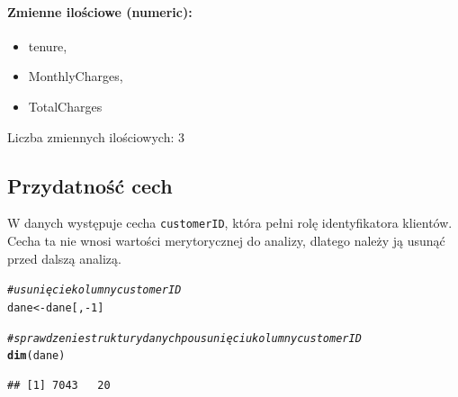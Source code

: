 \documentclass[12pt, a4paper]{article}\usepackage[]{graphicx}\usepackage[]{xcolor}
\makeatletter
\newcommand{\hlnum}[1]{\textcolor[rgb]{0.686,0.059,0.569}{#1}}%
\newcommand{\hlcom}[1]{\textcolor[rgb]{0.678,0.584,0.686}{\textit{#1}}}%
\newcommand{\hlopt}[1]{\textcolor[rgb]{0,0,0}{#1}}%
\newcommand{\hlstd}[1]{\textcolor[rgb]{0.345,0.345,0.345}{#1}}%
\newcommand{\hlkwb}[1]{\textcolor[rgb]{0.69,0.353,0.396}{#1}}%
\newcommand{\hlkwd}[1]{\textcolor[rgb]{0.737,0.353,0.396}{\textbf{#1}}}%
\newenvironment{kframe}{%
 \def\at@end@of@kframe{}%
 \ifinner\ifhmode%
  \def\at@end@of@kframe{\end{minipage}}%
  \begin{minipage}{\columnwidth}%
 \fi\fi%
 \def\FrameCommand##1{\hskip\@totalleftmargin \hskip-\fboxsep
 \colorbox{shadecolor}{##1}\hskip-\fboxsep
     \hskip-\linewidth \hskip-\@totalleftmargin \hskip\columnwidth}%
 \MakeFramed {\advance\hsize-\width
   \@totalleftmargin\z@ \linewidth\hsize
   \@setminipage}}%
 {\par\unskip\endMakeFramed%
 \at@end@of@kframe}
\newenvironment{knitrout}{}{} %
\makeatother
\begin{document}
\paragraph{Zmienne ilościowe (numeric):}
\begin{itemize}
\item tenure, \item MonthlyCharges, \item TotalCharges
\end{itemize}
Liczba zmiennych ilościowych: 3


\subsection{Przydatność cech}
W danych występuje cecha \texttt{customerID}, która pełni rolę identyfikatora klientów. Cecha ta nie wnosi wartości merytorycznej do analizy, dlatego należy ją usunąć przed dalszą analizą.

\begin{knitrout}
\color{fgcolor}\begin{kframe}
\begin{alltt}
\hlcom{# usunięcie kolumny customerID}
\hlstd{dane} \hlkwb{<-} \hlstd{dane[,}\hlopt{-}\hlnum{1}\hlstd{]}

\hlcom{# sprawdzenie struktury danych po usunięciu kolumny customerID}
\hlkwd{dim}\hlstd{(dane)}
\end{alltt}
\begin{verbatim}
## [1] 7043   20
\end{verbatim}
\end{kframe}
\end{knitrout}


\newpage
\end{document}
